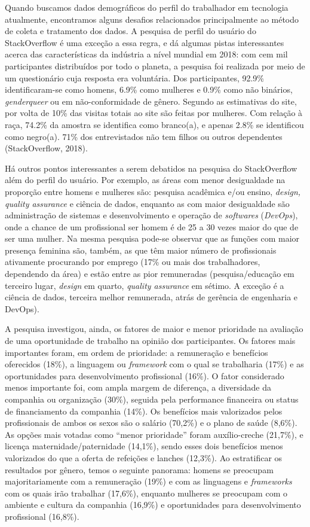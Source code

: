 Quando buscamos dados demográficos do perfil do trabalhador em tecnologia atualmente, encontramos alguns desafios relacionados principalmente ao método de coleta e tratamento dos dados. A pesquisa de perfil do usuário do StackOverflow é uma exceção a essa regra, e dá algumas pistas interessantes acerca das características da indústria a nível mundial em 2018: com cem mil participantes distribuídos por todo o planeta, a pesquisa foi realizada por meio de um questionário cuja resposta era voluntária. Dos participantes, 92.9\% identificaram-se como homens, 6.9\% como mulheres e 0.9\% como não binários, \textit{genderqueer} ou em não-conformidade de gênero. Segundo as estimativas do site, por volta de 10\% das visitas totais ao site são feitas por mulheres. Com relação à raça, 74.2\% da amostra se identifica como branco(a), e apenas 2.8\% se identificou como negro(a). 71\% dos entrevistados não tem filhos ou outros dependentes (StackOverflow, 2018).

Há outros pontos interessantes a serem debatidos na pesquisa do StackOverflow além do perfil do usuário. Por exemplo, as áreas com menor desigualdade na proporção entre homens e mulheres são: pesquisa acadêmica e/ou ensino, \textit{design, quality assurance} e ciência de dados, enquanto as com maior desigualdade são administração de sistemas e desenvolvimento e operação de \textit{softwares} (\textit{DevOps}), onde a chance de um profissional ser homem é de 25 a 30 vezes maior do que de ser uma mulher. Na mesma pesquisa pode-se observar que as funções com maior presença feminina são, também, as que têm maior número de profissionais ativamente procurando por emprego (17\% ou mais dos trabalhadores, dependendo da área) e estão entre as pior remuneradas (pesquisa/educação em terceiro lugar, \textit{design} em quarto, \textit{quality assurance} em sétimo. A exceção é a ciência de dados, terceira melhor remunerada, atrás de gerência de engenharia e DevOps).

A pesquisa investigou, ainda, os fatores de maior e menor prioridade na avaliação de uma oportunidade de trabalho na opinião dos participantes. Os fatores mais importantes foram, em ordem de prioridade: a remuneração e benefícios oferecidos (18\%), a linguagem ou \textit{framework} com o qual se trabalharia (17\%) e as oportunidades para desenvolvimento profissional (16\%). O fator considerado menos importante foi, com ampla margem de diferença, a diversidade da companhia ou organização (30\%), seguida pela performance financeira ou status de financiamento da companhia (14\%). Os benefícios mais valorizados pelos profissionais de ambos os sexos são o salário (70,2\%) e o plano de saúde (8,6\%). As opções mais votadas como “menor prioridade” foram auxílio-creche (21,7\%), e licença maternidade/paterni\-dade (14,1\%), sendo esses dois benefícios menos valorizados do que a oferta de refeições e lanches (12,3\%). Ao estratificar os resultados por gênero, temos o seguinte panorama: homens se preocupam majoritariamente com a remuneração (19\%) e com as linguagens e \textit{frameworks} com os quais irão trabalhar (17,6\%), enquanto mulheres se preocupam com o ambiente e cultura da companhia (16,9\%) e oportunidades para desenvolvimento profissional (16,8\%). 

